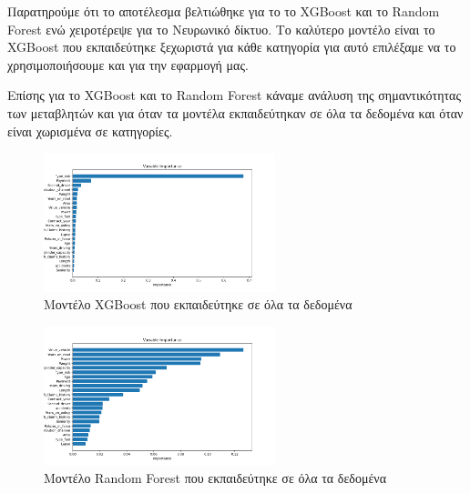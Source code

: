 \documentclass{llncs}
\begin{document}
Παρατηρούμε ότι το αποτέλεσμα βελτιώθηκε για το το XGBoost και το Random Forest ενώ χειροτέρεψε για το Νευρωνικό δίκτυο.
Το καλύτερο μοντέλο είναι το XGBoost που εκπαιδεύτηκε ξεχωριστά για κάθε κατηγορία
για αυτό επιλέξαμε να το χρησιμοποιήσουμε και για την εφαρμογή μας.

Επίσης για το XGBoost και το Random Forest κάναμε ανάλυση της σημαντικότητας 
των μεταβλητών και για όταν τα μοντέλα εκπαιδεύτηκαν σε όλα τα δεδομένα και όταν είναι χωρισμένα σε κατηγορίες.

\begin{figure}
    \begin{center}
        \includegraphics[width=0.6\textwidth]{images/feature_importance_combined_xgb.png}
    \end{center}
    \caption{Μοντέλο XGBoost που εκπαιδεύτηκε σε όλα τα δεδομένα}  
    \label{fig:XGBoost_all_feature_importance}  
\end{figure}

\begin{figure}
    \begin{center}
        \includegraphics[width=0.6\textwidth]{images/feature_importance_combined_random_forest.png}
    \end{center}
    \caption{Μοντέλο Random Forest που εκπαιδεύτηκε σε όλα τα δεδομένα}  
    \label{fig:random_forest_all_feature_importance}  
\end{figure}
\end{document}
